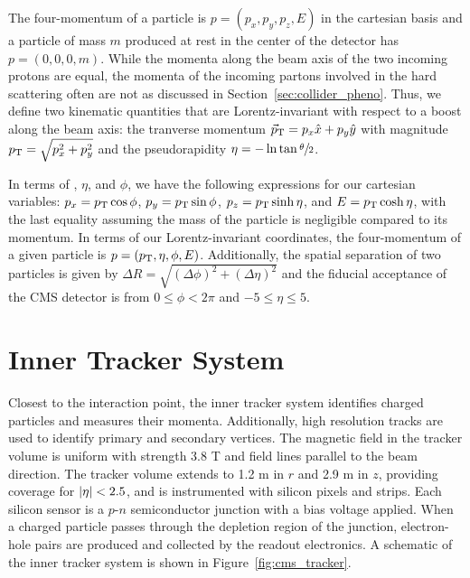 The four-momentum of a particle is $p = (p_x, p_y, p_z, E)$ in the cartesian basis 
and a particle of mass $m$ produced at rest in the center of the detector has $p = (0, 0, 0, m)$.
While the momenta along the beam axis of the two incoming protons are equal, the momenta of the incoming partons involved in the hard scattering often are not as discussed in Section~\ref{sec:collider_pheno}.
Thus, we define two kinematic quantities that are Lorentz-invariant with respect to a boost along the beam axis:
the tranverse momentum ${\vec p}_{\mathrm{T}} = p_x \hat x + p_y \hat y$ with magnitude $p_{\mathrm{T}} = \sqrt{p_x^2 + p_y^2}$ and the pseudorapidity $\eta = - \ln \tan\sfrac{\theta}{2}$.

In terms of \pt, $\eta$, and $\phi$, we have the following expressions for our cartesian variables: $p_x = p_{\mathrm{T}} \cos \phi$, $p_y = p_{\mathrm{T}} \sin \phi$, $p_z = p_{\mathrm{T}} \sinh \eta$, and $E = p_{\mathrm{T}} \cosh \eta$, with the last equality assuming the mass of the particle is negligible compared to its momentum.
In terms of our Lorentz-invariant coordinates, the four-momentum of a given particle is $p = (p_{\mathrm{T}}, \eta, \phi, E)$. 
Additionally, the spatial separation of two particles is given by $\Delta R = \sqrt{(\Delta\phi)^2 + (\Delta\eta)^2}$ and the fiducial acceptance of the CMS detector is from $0 \le \phi < 2\pi$ and $-5 \le \eta \le 5$.

\section{Inner Tracker System}
\label{sec:cms_tracker}

Closest to the interaction point, the inner tracker system identifies charged particles and measures their momenta.
Additionally, high resolution tracks are used to identify primary and secondary vertices.
The magnetic field in the tracker volume is uniform with strength 3.8 T and field lines parallel to the beam direction. 
The tracker volume extends to 1.2 m in $r$ and 2.9 m in $z$, providing coverage for $\lvert \eta \rvert < 2.5$,  and is instrumented with silicon pixels and strips.
Each silicon sensor is a $p$-$n$ semiconductor junction with a bias voltage applied.
When a charged particle passes through the depletion region of the junction, electron-hole pairs are produced and collected by the readout electronics.
A schematic of the inner tracker system is shown in Figure~\ref{fig:cms_tracker}.

